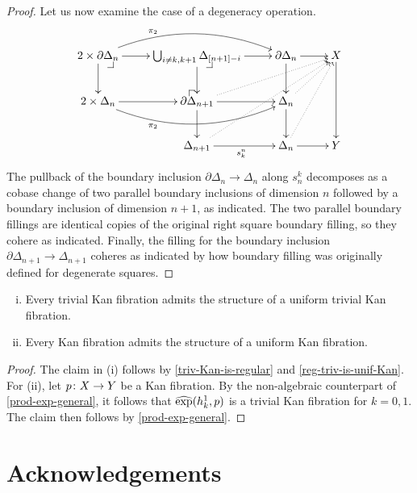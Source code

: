 \documentclass[reqno,10pt,a4paper,oneside]{amsart}
\begin{document}
\begin{proof}
Let us now examine the case of a degeneracy operation.
\[
\xymatrix{
  2 \times \partial \Delta_n
  \ar[r]
  \ar[d]
  \ar@/^2em/[rr]^(0.3){\pi_2}
  \pullback{dr}
&
  \bigcup_{i \neq k, k+1} \Delta_{[n+1] - i}
  \ar[r]
  \ar[d]
  \pullback{dr}
&
  \partial \Delta_n
  \ar[d]
  \ar[r]
&
  X
  \ar[dd]
\\
  2 \times \Delta_n
  \ar[r]
  \ar@/_2em/[rr]_(0.3){\pi_2}
&
  \partial \Delta_{n+1}
  \ar[r]
  \ar[d]
  \ar@{.>}[urr]
  \pullback{ul}
&
  \Delta_n
  \ar[d]
  \ar@{.>}[ur]
\\&
  \Delta_{n+1}
  \ar[r]_{s_k^n}
  \ar@{.>}[uurr]
&
  \Delta_n
  \ar[r]
  \ar@{.>}[uur]
&
  Y
}
\]
The pullback of the boundary inclusion $\partial \Delta_n \to \Delta_n$ along $s^k_n$ decomposes as a cobase change of two parallel boundary inclusions of dimension $n$ followed by a boundary inclusion of dimension $n+1$,
as indicated.
The two parallel boundary fillings are identical copies of the original right square boundary filling, so they cohere as indicated.
Finally, the filling for the boundary inclusion~$\partial \Delta_{n+1} \to \Delta_{n+1}$ coheres as indicated by how boundary filling was originally defined for degenerate squares.
\end{proof}











\begin{theorem}[ZFC]  \hfill 
\begin{enumerate}[(i)]
\item  Every trivial Kan fibration admits the structure of a uniform trivial Kan fibration.
\item Every Kan fibration admits the structure of a uniform  Kan fibration.
\end{enumerate} 
\end{theorem}

\begin{proof} The claim in (i) follows by \cref{triv-Kan-is-regular}  and \cref{reg-triv-is-unif-Kan}. For (ii), let
$p \colon X \to Y$ be a Kan fibration. By the non-algebraic counterpart of \cref{prod-exp-general}, it follows 
that $\operatorname{\widehat{exp}}(h_k^1, p)$ is a trivial Kan fibration for $k = 0, 1$. The claim then follows  by \cref{prod-exp-general}. 
\end{proof}




\section*{Acknowledgements}
\end{document}
